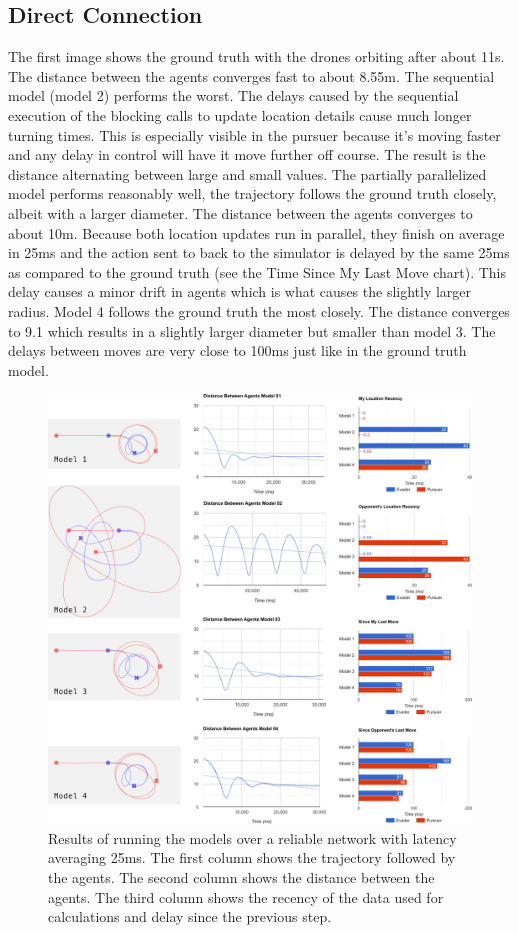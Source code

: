 \documentclass{article}
\begin{document}
\subsection{Direct Connection}
The first image shows the ground truth with the drones orbiting after about 11s. The distance between the agents converges fast to about 8.55m.
The sequential model (model 2) performs the worst. The delays caused by the sequential execution of the blocking calls to update location details cause much longer turning times. This is especially visible in the pursuer because it's moving faster and any delay in control will have it move further off course. The result is the distance alternating between large and small values.
The partially parallelized model performs reasonably well, the trajectory follows the ground truth closely, albeit with a larger diameter. The distance between the agents converges to about 10m. Because both location updates run in parallel, they finish on average in 25ms and the action sent to back to the simulator is delayed by the same 25ms as compared to the ground truth (see the Time Since My Last Move chart). This delay causes a minor drift in agents which is what causes the slightly larger radius.
Model 4 follows the ground truth the most closely. The distance converges to 9.1 which results in a slightly larger diameter but smaller than model 3. The delays between moves are very close to 100ms just like in the ground truth model.

\begin{figure}
	\centering
	\includegraphics[width=18.0cm]{charts-no-vpn}
	\caption{Results of running the models over a reliable network with latency averaging 25ms. The first column shows the trajectory followed by the agents. The second column shows the distance between the agents. The third column shows the recency of the data used for calculations and delay since the previous step.}\label{fig:charts-no-vpn}
\end{figure}
\end{document}
